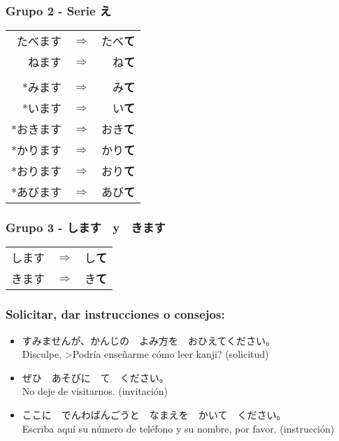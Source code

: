 \documentclass[a4paper,12pt,oneside]{report}
\def\then{$\Longrightarrow$}
\def\bv{\textbf{V}} %
\begin{document}
\begin{CJK*}{UTF8}{min}
        \subsubsection{Grupo 2 - Serie え}
        \begin{tabular}{rcr}
          たべます & \then & たべ\textbf{て} \\
          ねます & \then & ね\textbf{て} \\
          &&\\
          $*$みます & \then & み\textbf{て} \\
          $*$います & \then & い\textbf{て} \\
          $*$おきます & \then & おき\textbf{て} \\
          $*$かります & \then & かり\textbf{て} \\
          $*$おります & \then & おり\textbf{て} \\
          $*$あびます & \then & あび\textbf{て} \\
        \end{tabular}

        \subsubsection{Grupo 3 - します　y　きます}
        \begin{tabular}{rcr}
          します & \then & し\textbf{て} \\
          きます & \then & き\textbf{て} \\
        \end{tabular}

      \subsubsection{Solicitar, dar instrucciones o consejos:}
        \fbox{\bv(て) + ください}

        \begin{itemize}
          \item すみませんが、かんじの　よみ方を　おひえてください。\\
                Disculpe, >Podr\'ia enseñarme c\'omo leer kanji? (solicitud)
          \item ぜひ　あそびに　て　ください。\\
                No deje de visitarnos. (invitaci\'on)
          \item ここに　でんわばんごうと　なまえを　かいて　ください。\\
                Escriba aqu\'i su n\'umero de tel\'efono y su nombre, por favor. (instrucci\'on)
        \end{itemize}


\end{CJK*}
\end{document}
